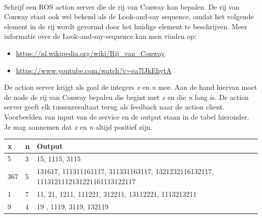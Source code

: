 \begin{exercise}\mbox{}\\
Schrijf een ROS action server die de rij van Conway kan bepalen. De rij van Conway staat ook wel bekend als de Look-and-say sequence, omdat het volgende element in de rij wordt gevormd door het huidige element te beschrijven. Meer informatie over de Look-and-say-sequence kan men vinden op:
\begin{itemize}
    \item \url{https://nl.wikipedia.org/wiki/Rij_van_Conway}
    \item \url{https://www.youtube.com/watch?v=ea7lJkEhytA}
\end{itemize}

De action server krijgt als goal de integers \textit{x} en \textit{n} mee. Aan de hand hiervan moet de node de rij van Conway bepalen die begint met \textit{x} en die \textit{n} lang is. De action server geeft elk tussenresultaat terug als feedback naar de action client. Voorbeelden van input van de service en de output staan in de tabel hieronder. Je mag aannemen dat \textit{x} en \textit{n} altijd positief zijn.

\vspace{0.5cm}

\begin{minipage}{0.6\textwidth}

\begin{tabular}{|l|l|p{6cm}|} \hline
\textbf{x} & \textbf{n} & \textbf{Output}  \\ \hline
5 & 3 & 15, 1115, 3115 \\ \hline
367 & 5 & 131617, 111311161117, 311331163117, 1321232116132117, 1113121112131221161113122117  \\ \hline
1 & 7 & 11, 21, 1211, 111221, 312211, 13112221, 1113213211 \\ \hline
9 & 4 & 19 , 1119, 3119, 132119 \\ \hline
\end{tabular}


\end{minipage}
\end{exercise}
